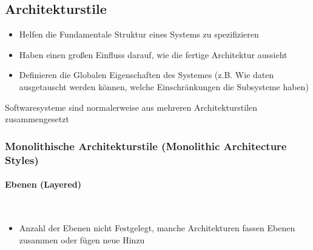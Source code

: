 \documentclass[ngerman]{tuda_summary}
\begin{document}
\subsection{Architekturstile}
\begin{itemize}
    \item Helfen die Fundamentale Struktur eines Systems zu spezifizieren
    \item Haben einen großen Einfluss darauf, wie die fertige Architektur aussieht
    \item Definieren die Globalen Eigenschaften des Systemes (z.B. Wie daten ausgetauscht werden können, welche Einschränkungen die Subsysteme haben)
\end{itemize}
Softwaresysteme sind normalerweise aus mehreren Architekturstilen zusammengesetzt
\clearpage
\subsubsection{Monolithische Architekturstile (Monolithic Architecture Styles)}
\paragraph{Ebenen (Layered)}\mbox{}\\
\begin{figure}[h]
    \centering
\end{figure}
\FloatBarrier
\begin{itemize}
    \item Anzahl der Ebenen nicht Festgelegt, manche Architekturen fassen Ebenen zusammen oder fügen neue Hinzu
\end{itemize}
\end{document}
